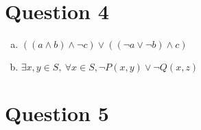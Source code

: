 \documentclass[12pt]{article}
\begin{document}
\section*{Question 4}
\begin{enumerate}[a.]
    \item $((a \land b) \land \neg c) \lor ((\neg a \lor \neg b) \land c)$
    \item $\exists x,y \in S,\:\forall x \in S, \neg P(x,y) \lor \neg Q(x,z)$
\end{enumerate}

\section*{Question 5}
\end{document}
